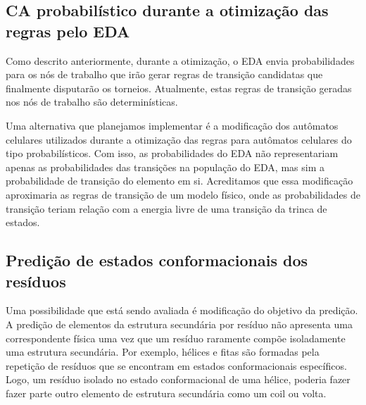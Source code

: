%






\subsection{CA probabilístico durante a otimização das regras pelo EDA}

Como descrito anteriormente, durante a otimização, o EDA envia probabilidades para os nós de trabalho que irão gerar regras de transição candidatas que finalmente disputarão os torneios. Atualmente, estas regras de transição geradas nos nós de trabalho são determinísticas. 
 
Uma alternativa que planejamos implementar é a modificação dos autômatos celulares utilizados durante a otimização das regras para autômatos celulares do tipo probabilísticos. Com isso, as probabilidades do EDA não representariam apenas as probabilidades das transições na população do EDA, mas sim a probabilidade de transição do elemento em si. Acreditamos que essa modificação aproximaria as regras de transição de um modelo físico, onde as probabilidades de transição teriam relação com a energia livre de uma transição da trinca de estados. 





\subsection{Predição de estados conformacionais dos resíduos}

Uma possibilidade que está sendo avaliada é modificação do objetivo da predição. A predição de elementos da estrutura secundária por resíduo não apresenta uma correspondente física uma vez que um resíduo raramente compõe isoladamente uma estrutura secundária. Por exemplo, hélices e fitas são formadas pela repetição de resíduos que se encontram em estados conformacionais específicos. Logo, um resíduo isolado no estado conformacional de uma hélice, poderia fazer fazer parte outro elemento de estrutura secundária como um coil ou volta.

